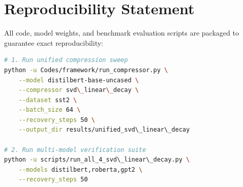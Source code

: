 \section{Reproducibility Statement}
All code, model weights, and benchmark evaluation scripts are packaged to guarantee exact reproducibility:
\begin{lstlisting}[language=bash]
# 1. Run unified compression sweep
python -u Codes/framework/run_compressor.py \
    --model distilbert-base-uncased \
    --compressor svd\_linear\_decay \
    --dataset sst2 \
    --batch_size 64 \
    --recovery_steps 50 \
    --output_dir results/unified_svd\_linear\_decay

# 2. Run multi-model verification suite
python -u scripts/run_all_4_svd\_linear\_decay.py \
    --models distilbert,roberta,gpt2 \
    --recovery_steps 50
\end{lstlisting}
